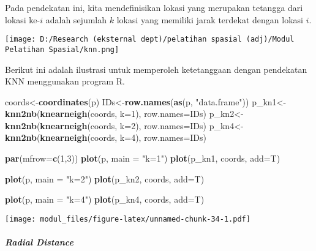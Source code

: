 \documentclass[
]{book}
\newenvironment{Shaded}{\begin{snugshade}}{\end{snugshade}}
\newcommand{\DataTypeTok}[1]{\textcolor[rgb]{0.13,0.29,0.53}{#1}}
\newcommand{\DecValTok}[1]{\textcolor[rgb]{0.00,0.00,0.81}{#1}}
\newcommand{\KeywordTok}[1]{\textcolor[rgb]{0.13,0.29,0.53}{\textbf{#1}}}
\newcommand{\NormalTok}[1]{#1}
\newcommand{\StringTok}[1]{\textcolor[rgb]{0.31,0.60,0.02}{#1}}
\begin{document}
Pada pendekatan ini, kita mendefinisikan lokasi yang merupakan tetangga dari lokasi ke-\(i\) adalah sejumlah \(k\) lokasi yang memiliki jarak terdekat dengan lokasi \(i\).

\texttt{[image: D:/Research (eksternal dept)/pelatihan spasial (adj)/Modul Pelatihan Spasial/knn.png]}

Berikut ini adalah ilustrasi untuk memperoleh ketetanggaan dengan pendekatan KNN menggunakan program R.

\begin{Shaded}
\begin{Highlighting}[]
\NormalTok{coords\textless{}{-}}\KeywordTok{coordinates}\NormalTok{(p)}
\NormalTok{IDs\textless{}{-}}\KeywordTok{row.names}\NormalTok{(}\KeywordTok{as}\NormalTok{(p, }\StringTok{"data.frame"}\NormalTok{))}
\NormalTok{p\_kn1\textless{}{-}}\KeywordTok{knn2nb}\NormalTok{(}\KeywordTok{knearneigh}\NormalTok{(coords, }\DataTypeTok{k=}\DecValTok{1}\NormalTok{), }\DataTypeTok{row.names=}\NormalTok{IDs)}
\NormalTok{p\_kn2\textless{}{-}}\KeywordTok{knn2nb}\NormalTok{(}\KeywordTok{knearneigh}\NormalTok{(coords, }\DataTypeTok{k=}\DecValTok{2}\NormalTok{), }\DataTypeTok{row.names=}\NormalTok{IDs)}
\NormalTok{p\_kn4\textless{}{-}}\KeywordTok{knn2nb}\NormalTok{(}\KeywordTok{knearneigh}\NormalTok{(coords, }\DataTypeTok{k=}\DecValTok{4}\NormalTok{), }\DataTypeTok{row.names=}\NormalTok{IDs)}

\KeywordTok{par}\NormalTok{(}\DataTypeTok{mfrow=}\KeywordTok{c}\NormalTok{(}\DecValTok{1}\NormalTok{,}\DecValTok{3}\NormalTok{))}
\KeywordTok{plot}\NormalTok{(p, }\DataTypeTok{main =} \StringTok{"k=1"}\NormalTok{)}
\KeywordTok{plot}\NormalTok{(p\_kn1, coords, }\DataTypeTok{add=}\NormalTok{T)}

\KeywordTok{plot}\NormalTok{(p, }\DataTypeTok{main =} \StringTok{"k=2"}\NormalTok{)}
\KeywordTok{plot}\NormalTok{(p\_kn2, coords, }\DataTypeTok{add=}\NormalTok{T)}

\KeywordTok{plot}\NormalTok{(p, }\DataTypeTok{main =} \StringTok{"k=4"}\NormalTok{)}
\KeywordTok{plot}\NormalTok{(p\_kn4, coords, }\DataTypeTok{add=}\NormalTok{T)}
\end{Highlighting}
\end{Shaded}

\texttt{[image: modul\_files/figure-latex/unnamed-chunk-34-1.pdf]}

\hypertarget{radial-distance}{%
\paragraph{\texorpdfstring{\emph{Radial Distance}}{Radial Distance}}\label{radial-distance}}
\end{document}
